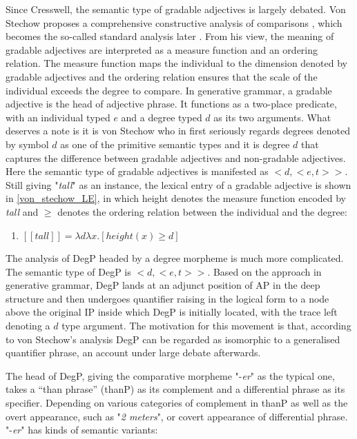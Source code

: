 \documentclass{ctexart}
\let \cite \parencite
\begin{document}
Since Cresswell, the semantic type of gradable adjectives is largely debated. Von Stechow proposes a comprehensive constructive analysis of comparisons \cite{von1984a}, which becomes the so-called standard analysis later \cite{bale2011}. From his view, the meaning of gradable adjectives are interpreted as a measure function and an ordering relation. The measure function maps the individual to the dimension denoted by gradable adjectives and the ordering relation ensures that the scale of the individual exceeds the degree to compare. In generative grammar, a gradable adjective is the head of adjective phrase. It functions as a two-place predicate, with an individual typed $e$ and a degree typed $d$ as its two arguments. What deserves a note is it is von Stechow who in first seriously regards degrees denoted by symbol $d$ as one of the primitive semantic types and it is degree $d$ that captures the difference between gradable adjectives and non-gradable adjectives. Here the semantic type of gradable adjectives is manifested as $<d,<e,t>>$. Still giving "\textit{tall}" as an instance, the lexical entry of a gradable adjective is shown in \ref{von_stechow_LE}, in which height denotes the measure function encoded by \textit{tall} and $\geq$ denotes the ordering relation between the individual and the degree:

\begin{enumerate}[resume]
    \item \label{von_stechow_LE} $[\![tall]\!] = \lambda d \lambda x. [height(x) \geq d]$
\end{enumerate}

The analysis of DegP headed by a degree morpheme is much more complicated. The semantic type of DegP is $<d,<e,t>>$. Based on the approach in generative grammar, DegP lands at an adjunct position of AP in the deep structure and then undergoes quantifier raising in the logical form to a node above the original IP inside which DegP is initially located, with the trace left denoting a $d$ type argument. The motivation for this movement is that, according to von Stechow’s analysis DegP can be regarded as isomorphic to a generalised quantifier phrase, an account under large debate afterwards.

The head of DegP, giving the comparative morpheme "-\textit{er}" as the typical one, takes a “than phrase” (thanP) as its complement and a differential phrase as its specifier. Depending on various categories of complement in thanP as well as the overt appearance, such as "\textit{2 meters}", or covert appearance of differential phrase. "-\textit{er}" has kinds of semantic variants:
\end{document}
